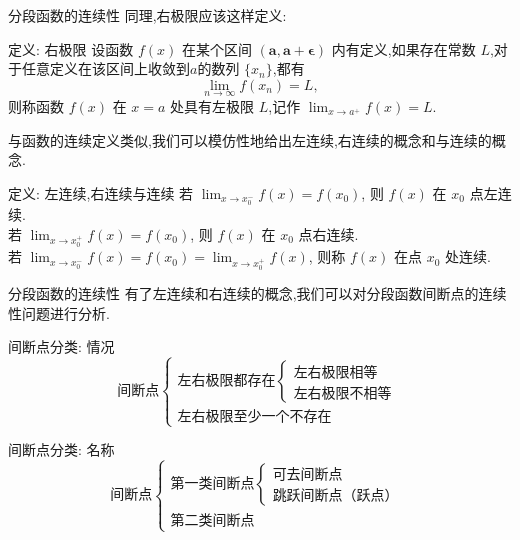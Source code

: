 \documentclass[
10pt,
aspectratio=43,
]{beamer}
\begin{document}
\begin{frame}{分段函数的连续性}
	同理,右极限应该这样定义: 
	\begin{block}{定义: 右极限}
			设函数 $f(x)$ 在某个区间 $\bm{(a,a+\epsilon)}$ 内有定义,如果存在常数 $L$,对于任意定义在该区间上收敛到$a$的数列 $\{x_n\}$,都有 
		\begin{equation*}
		\lim_{n\to\infty} f(x_n) = L,
		\end{equation*}
		则称函数 $f(x)$ 在 $x=a$ 处具有左极限 $L$,记作 $\lim_{x \to a^{+}} f(x) = L$.
	\end{block}
	\pause
	与函数的连续定义类似,我们可以模仿性地给出左连续,右连续的概念和与连续的概念.
	\begin{block}{定义: 左连续,右连续与连续}
		若 $\lim _{x \rightarrow x_0^{-}} f(x)=f\left(x_0\right)$,  则 $f(x)$ 在 $x_0$ 点左连续.\\
		若 $\lim _{x \rightarrow x_0^{+}} f(x)=f\left(x_0\right) $, 则 $f(x)$ 在 $x_0$ 点右连续.\\
		若 $\lim _{x \rightarrow x_0^{-}} f(x)=f\left(x_0\right)=\lim _{x \rightarrow x_0^{+}} f(x)$, 则称 $f(x)$ 在点 $x_0$ 处连续.
	\end{block}
\end{frame}

\begin{frame}{分段函数的连续性}
	有了左连续和右连续的概念,我们可以对分段函数间断点的连续性问题进行分析.
	\pause
	\begin{block}{间断点分类: 情况}
		\begin{equation*}
			\text{间断点}\left\{
				\begin{array}{ll}
					\text{左右极限都存在}\left\{
						\begin{array}{ll}
							\text{左右极限相等}\\
							\text{左右极限不相等}
						\end{array}
					\right.\\
					\text{左右极限至少一个不存在}
				\end{array}
			\right.
		\end{equation*}
	\end{block}
	\pause
	\begin{exampleblock}{间断点分类: 名称}
		\begin{equation*}
			\text{间断点}\left\{
				\begin{array}{ll}
					\text{第一类间断点}\left\{
						\begin{array}{ll}
							\text{可去间断点}\\
							\text{跳跃间断点（跃点）}
						\end{array}
					\right.\\
					\text{第二类间断点}
				\end{array}
			\right.
		\end{equation*}
	\end{exampleblock}
\end{frame}
\end{document}
